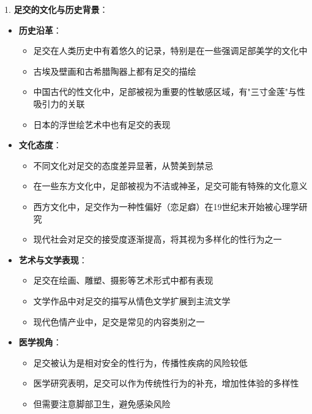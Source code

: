 \documentclass[12pt,UTF8]{ctexbook}
\begin{document}
1. \textbf{足交的文化与历史背景}：
\begin{itemize}
	\item \textbf{历史沿革}：
	\begin{itemize}
		\item 足交在人类历史中有着悠久的记录，特别是在一些强调足部美学的文化中
		\item 古埃及壁画和古希腊陶器上都有足交的描绘
		\item 中国古代的性文化中，足部被视为重要的性敏感区域，有"三寸金莲"与性吸引力的关联
		\item 日本的浮世绘艺术中也有足交的表现
	\end{itemize}
	\item \textbf{文化态度}：
	\begin{itemize}
		\item 不同文化对足交的态度差异显著，从赞美到禁忌
		\item 在一些东方文化中，足部被视为不洁或神圣，足交可能有特殊的文化意义
		\item 西方文化中，足交作为一种性偏好（恋足癖）在19世纪末开始被心理学研究
		\item 现代社会对足交的接受度逐渐提高，将其视为多样化的性行为之一
	\end{itemize}
	\item \textbf{艺术与文学表现}：
	\begin{itemize}
		\item 足交在绘画、雕塑、摄影等艺术形式中都有表现
		\item 文学作品中对足交的描写从情色文学扩展到主流文学
		\item 现代色情产业中，足交是常见的内容类别之一
	\end{itemize}
	\item \textbf{医学视角}：
	\begin{itemize}
		\item 足交被认为是相对安全的性行为，传播性疾病的风险较低
		\item 医学研究表明，足交可以作为传统性行为的补充，增加性体验的多样性
		\item 但需要注意脚部卫生，避免感染风险
	\end{itemize}
\end{itemize}
\end{document}
